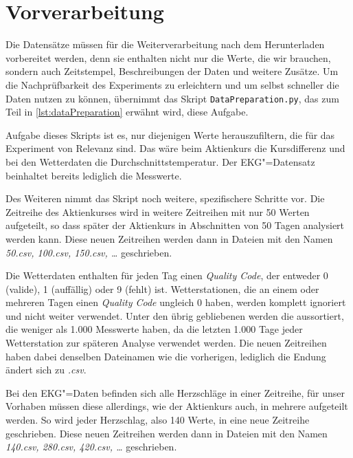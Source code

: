\section{Vorverarbeitung}
Die Datensätze müssen für die Weiterverarbeitung nach dem Herunterladen vorbereitet werden, denn sie enthalten nicht nur die Werte, die wir brauchen, sondern auch Zeitstempel, Beschreibungen der Daten und weitere Zusätze. Um die Nachprüfbarkeit des Experiments zu erleichtern und um selbst schneller die Daten nutzen zu können, übernimmt das Skript \lstinline|DataPreparation.py|, das zum Teil in \autoref{lst:dataPreparation} erwähnt wird, diese Aufgabe.

Aufgabe dieses Skripts ist es, nur diejenigen Werte herauszufiltern, die für das Experiment von Relevanz sind. Das wäre beim Aktienkurs die Kursdifferenz und bei den Wetterdaten die Durchschnittstemperatur. Der EKG"=Datensatz beinhaltet bereits lediglich die Messwerte. 

Des Weiteren nimmt das Skript noch weitere, spezifischere Schritte vor. Die Zeitreihe des Aktienkurses wird in weitere Zeitreihen mit nur 50 Werten aufgeteilt, so dass später der Aktienkurs in Abschnitten von 50 Tagen analysiert werden kann. Diese neuen Zeitreihen werden dann in Dateien mit den Namen \textit{50.csv, 100.csv, 150.csv, \dots} geschrieben.

Die Wetterdaten enthalten für jeden Tag einen \textit{Quality Code}, der entweder 0 (valide), 1 (auffällig) oder 9 (fehlt) ist. Wetterstationen, die an einem oder mehreren Tagen einen \textit{Quality Code} ungleich 0 haben, werden komplett ignoriert und nicht weiter verwendet. Unter den übrig gebliebenen werden die aussortiert, die weniger als 1.000 Messwerte haben, da die letzten 1.000 Tage jeder Wetterstation zur späteren Analyse verwendet werden. Die neuen Zeitreihen haben dabei denselben Dateinamen wie die vorherigen, lediglich die Endung ändert sich zu \textit{.csv}.

Bei den EKG"=Daten befinden sich alle Herzschläge in einer Zeitreihe, für unser Vorhaben müssen diese allerdings, wie der Aktienkurs auch, in mehrere aufgeteilt werden. So wird jeder Herzschlag, also 140 Werte, in eine neue Zeitreihe geschrieben. Diese neuen Zeitreihen werden dann in Dateien mit den Namen \textit{140.csv, 280.csv, 420.csv, \dots} geschrieben.